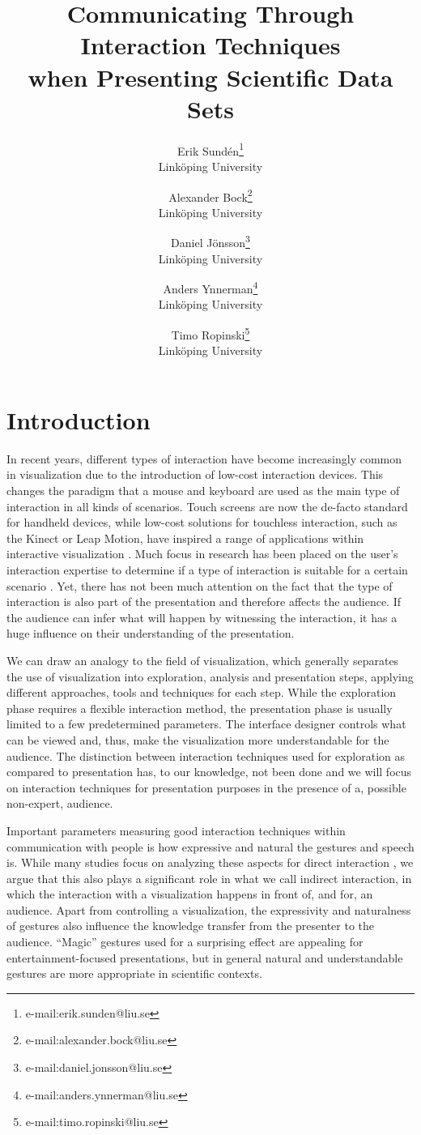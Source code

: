\documentclass[review,journal]{vgtc}         %
\title{Communicating Through Interaction Techniques\\when Presenting Scientific Data Sets} %
\author{Erik Sund\'en\thanks{e-mail:erik.sunden@liu.se}\\ %
        \scriptsize Link{\"o}ping University %
\and Alexander Bock\thanks{e-mail:alexander.bock@liu.se}\\ %
			   \scriptsize Link{\"o}ping University %
\and Daniel J\"onsson\thanks{e-mail:daniel.jonsson@liu.se}\\ %
          \scriptsize Link{\"o}ping University %
\and Anders Ynnerman\thanks{e-mail:anders.ynnerman@liu.se}\\ %
          \scriptsize Link{\"o}ping University %
\and Timo Ropinski\thanks{e-mail:timo.ropinski@liu.se}\\ %
           \scriptsize Link{\"o}ping University }
\begin{document}
\maketitle

\section{Introduction}\label{sec:introduction}
In recent years, different types of interaction have become increasingly common in visualization due to the introduction of low-cost interaction devices.
This changes the paradigm that a mouse and keyboard are used as the main type of interaction in all kinds of scenarios.
Touch screens are now the de-facto standard for handheld devices, while low-cost solutions for touchless interaction, such as the Kinect or Leap Motion, have inspired a range of applications within interactive visualization \cite{zora82163, Jalaliniya:2013:TIM:2494091.2497332, OHaraGSPVMCCRDC14, 0724-4983}.
Much focus in research has been placed on the user's interaction expertise to determine if a type of interaction is suitable for a certain scenario \cite{DBLP:journals/tvcg/YiKSJ07}.
Yet, there has not been much attention on the fact that the type of interaction is also part of the presentation and therefore affects the audience.
If the audience can infer what will happen by witnessing the interaction, it has a huge influence on their understanding of the presentation.

We can draw an analogy to the field of visualization, which generally separates the use of visualization into exploration, analysis and presentation steps, applying different approaches, tools and techniques for each step.
While the exploration phase requires a flexible interaction method, the presentation phase is usually limited to a few predetermined parameters.
The interface designer controls what can be viewed and, thus, make the visualization more understandable for the audience.
The distinction between interaction techniques used for exploration as compared to presentation has, to our knowledge, not been done and we will focus on interaction techniques for presentation purposes in the presence of a, possible non-expert, audience.

Important parameters measuring good interaction techniques within communication with people is how expressive \cite{Brewster:2009:MIE:2227763.2227769} and natural the gestures and speech is.
While many studies focus on analyzing these aspects for direct interaction \cite{978-3-642-12552-2, Caridakis:2013:NIE:2504335.2504378}, we argue that this also plays a significant role in what we call indirect interaction, in which the interaction with a visualization happens in front of, and for, an audience.
Apart from controlling a visualization, the expressivity and naturalness of gestures also influence the knowledge transfer from the presenter to the audience.
``Magic'' gestures used for a surprising effect are appealing for entertainment-focused presentations, but in general natural and understandable gestures are more appropriate in scientific contexts.
\end{document}
